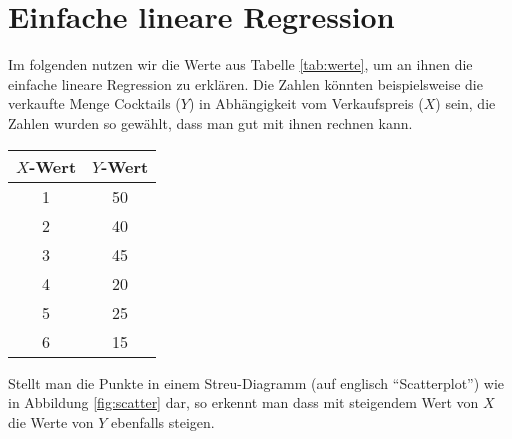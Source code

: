 \documentclass[ngerman, 12pt]{scrartcl}
\begin{document}
\section{Einfache lineare Regression}

Im folgenden nutzen wir die Werte aus Tabelle \ref{tab:werte}, um an ihnen die einfache lineare Regression zu erklären. Die Zahlen könnten beispielsweise die verkaufte Menge Cocktails (\(Y\)) in Abhängigkeit vom Verkaufspreis (\(X\)) sein, die Zahlen wurden so gewählt, dass man gut mit ihnen rechnen kann. 

\begin{center}
\begin{tabular}{cc} \toprule[2pt]
$X$-Wert & $Y$-Wert \\ \midrule
        1 &50\\
        2 &40\\
        3 &45\\
        4 &20\\
        5 &25\\ 
        6 & 15 \\ \bottomrule[2pt]
\end{tabular}
\end{center}
\label{tab:werte}\vspace*{1em}

Stellt man die Punkte in einem Streu-Diagramm (auf englisch \enquote{Scatterplot}) wie in Abbildung \ref{fig:scatter} dar, so erkennt man dass mit steigendem Wert von $X$ die Werte von $Y$ ebenfalls steigen.
\end{document}
